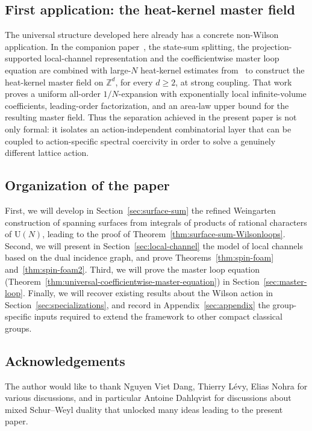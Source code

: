\documentclass[11pt,a4paper,reqno]{article}
\theoremstyle{definition}
\theoremstyle{remark}
\newcommand\U{{\mathrm U}}
\newcommand\Z{{\mathbb Z}}
\begin{document}
\subsection{First application: the heat-kernel master field}

The universal structure developed here already has a concrete non-Wilson application. In the companion paper~\cite{Lem26prep}, the state-sum splitting, the projection-supported local-channel representation and the coefficientwise master loop equation are combined with large-$N$ heat-kernel estimates from~\cite{LemMai25,LM2} to construct the heat-kernel master field on $\Z^d$, for every $d\ge2$, at strong coupling. That work proves a uniform all-order $1/N$-expansion with exponentially local infinite-volume coefficients, leading-order factorization, and an area-law upper bound for the resulting master field. Thus the separation achieved in the present paper is not only formal: it isolates an action-independent combinatorial layer that can be coupled to action-specific spectral coercivity in order to solve a genuinely different lattice action.

\subsection{Organization of the paper}

First, we will develop in Section~\ref{sec:surface-sum} the refined Weingarten construction of spanning surfaces from integrals of products of rational characters of $\U(N)$, leading to the proof of Theorem~\ref{thm:surface-sum-Wilsonloops}. Second, we will present in Section~\ref{sec:local-channel} the model of local channels based on the dual incidence graph, and prove Theorems~\ref{thm:spin-foam} and~\ref{thm:spin-foam2}. Third, we will prove the master loop equation (Theorem~\ref{thm:universal-coefficientwise-master-equation}) in Section~\ref{sec:master-loop}. Finally, we will recover existing results about the Wilson action in Section~\ref{sec:specializations}, and record in Appendix~\ref{sec:appendix} the group-specific inputs required to extend the framework to other compact classical groups.

\subsection*{Acknowledgements}

The author would like to thank Nguyen Viet Dang, Thierry L\'evy, Elias Nohra for various discussions, and in particular Antoine Dahlqvist for discussions about mixed Schur--Weyl duality that unlocked many ideas leading to the present paper.
\end{document}
